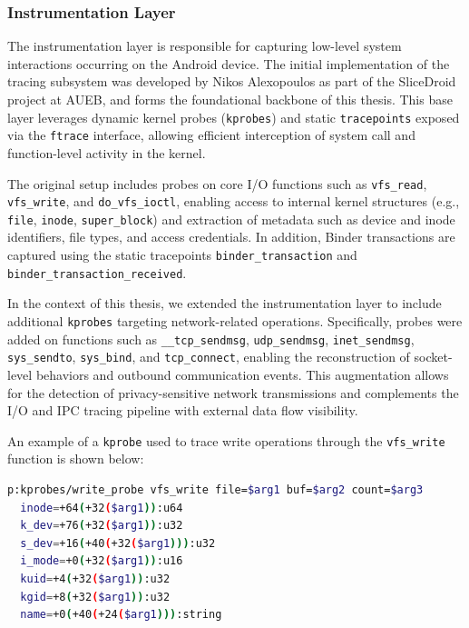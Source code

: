\documentclass[a4paper,12pt]{report}
\begin{document}
\subsubsection{Instrumentation Layer}

The instrumentation layer is responsible for capturing low-level system interactions occurring on the Android device. The initial implementation of the tracing subsystem was developed by Nikos Alexopoulos as part of the SliceDroid project at AUEB, and forms the foundational backbone of this thesis. This base layer leverages dynamic kernel probes (\texttt{kprobes}) and static \texttt{tracepoints} exposed via the \texttt{ftrace} interface, allowing efficient interception of system call and function-level activity in the kernel.

The original setup includes probes on core I/O functions such as \texttt{vfs\_read}, \texttt{vfs\_write}, and \texttt{do\_vfs\_ioctl}, enabling access to internal kernel structures (e.g., \texttt{file}, \texttt{inode}, \texttt{super\_block}) and extraction of metadata such as device and inode identifiers, file types, and access credentials. In addition, Binder transactions are captured using the static tracepoints \texttt{binder\_transaction} and \texttt{binder\_transaction\_received}.

In the context of this thesis, we extended the instrumentation layer to include additional \texttt{kprobes} targeting network-related operations. Specifically, probes were added on functions such as \texttt{\_\_tcp\_sendmsg}, \texttt{udp\_sendmsg}, \texttt{inet\_sendmsg}, \texttt{sys\_sendto}, \texttt{sys\_bind}, and \texttt{tcp\_connect}, enabling the reconstruction of socket-level behaviors and outbound communication events. This augmentation allows for the detection of privacy-sensitive network transmissions and complements the I/O and IPC tracing pipeline with external data flow visibility.

An example of a \texttt{kprobe} used to trace write operations through the \texttt{vfs\_write} function is shown below:

\begin{lstlisting}[language=bash,caption={Example kprobe for vfs\_write in tracefs syntax}]
p:kprobes/write_probe vfs_write file=$arg1 buf=$arg2 count=$arg3
  inode=+64(+32($arg1)):u64
  k_dev=+76(+32($arg1)):u32
  s_dev=+16(+40(+32($arg1))):u32
  i_mode=+0(+32($arg1)):u16
  kuid=+4(+32($arg1)):u32
  kgid=+8(+32($arg1)):u32
  name=+0(+40(+24($arg1))):string
\end{lstlisting}
\end{document}
